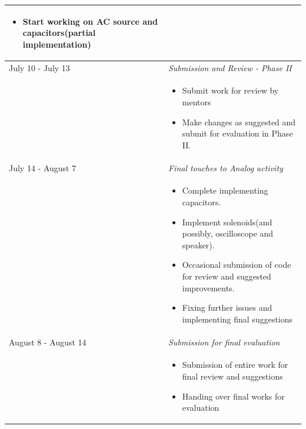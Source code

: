 \documentclass[preprint,12pt]{elsarticle}
\begin{document}
\begin{center}
\begin{tabularx}{\linewidth}{|l|X|}
{\begin{itemize}[noitemsep, topsep=2pt]
	\begin{itemize}
		\item Start working on AC source and capacitors(partial implementation)
	\end{itemize}
\end{itemize}
}\\
\hline\hline

{July 10  - July 13} & {\textit{Submission and Review - Phase II
}}\\
\hline

 & \par
\parbox{12cm}{
\begin{itemize}[noitemsep, topsep=2pt]
	\item Submit work for review by mentors
	\item Make changes as suggested and submit for evaluation in Phase II.
\end{itemize}
}\\
\hline\hline

{July 14 - August 7} & {\textit{Final touches to Analog activity
}}\\
\hline

 & \par
\parbox{12cm}{
\begin{itemize}[noitemsep, topsep=2pt]
	\item Complete implementing capacitors.
	\item Implement solenoids(and possibly, oscilloscope and speaker).
	\item Occasional submission of code for review and suggested improvements.
	\item Fixing further issues and implementing final suggestions
\end{itemize}
}\\
\hline\hline

{August 8 - August 14} & {\textit{Submission for final evaluation
}}\\
\hline

 & \par
\parbox{12cm}{
\begin{itemize}[noitemsep, topsep=2pt]
	\item Submission of entire work for final review and suggestions
	\item Handing over final works for evaluation
\end{itemize}
}\\
\hline\hline

\end{tabularx}
\end{center}
\bigskip\bigskip
\end{document}
